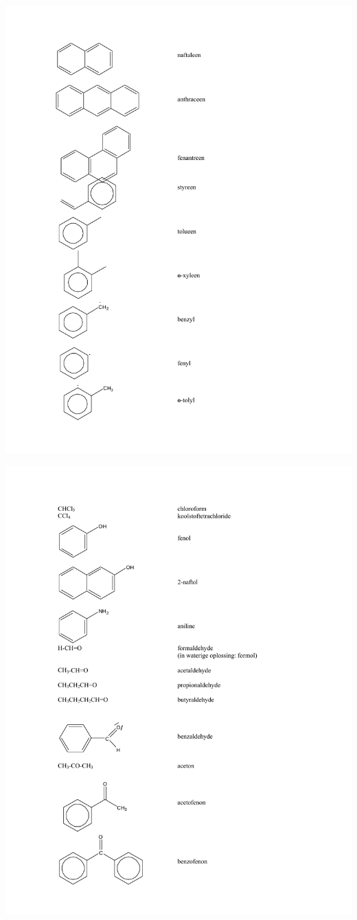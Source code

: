 \begin{center}
	\includegraphics[width=1.00\textwidth]{Appendix/Org09.pdf}
\end{center}
\begin{center}
	\includegraphics[width=1.00\textwidth]{Appendix/Org10.pdf}
\end{center}
